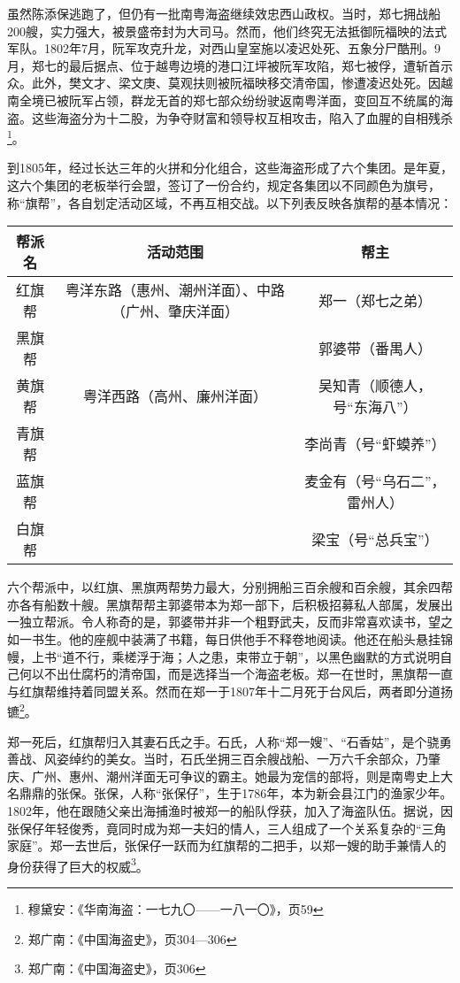 虽然陈添保逃跑了，但仍有一批南粤海盗继续效忠西山政权。当时，郑七拥战船200艘，实力强大，被景盛帝封为大司马。然而，他们终究无法抵御阮福映的法式军队。1802年7月，阮军攻克升龙，对西山皇室施以凌迟处死、五象分尸酷刑。9月，郑七的最后据点、位于越粤边境的港口江坪被阮军攻陷，郑七被俘，遭斩首示众。此外，樊文才、梁文庚、莫观扶则被阮福映移交清帝国，惨遭凌迟处死。因越南全境已被阮军占领，群龙无首的郑七部众纷纷驶返南粤洋面，变回互不统属的海盗。这些海盗分为十二股，为争夺财富和领导权互相攻击，陷入了血腥的自相残杀\footnote{穆黛安：《华南海盗：一七九〇——一八一〇》，页59}。

到1805年，经过长达三年的火拼和分化组合，这些海盗形成了六个集团。是年夏，这六个集团的老板举行会盟，签订了一份合约，规定各集团以不同颜色为旗号，称“旗帮”，各自划定活动区域，不再互相交战。以下列表反映各旗帮的基本情况：

\begin{center}
	\begin{tabular}{ c | c | c}
		\hline
		帮派名 & 活动范围 & 帮主 \\
		\hline
		
		红旗帮 & 粤洋东路（惠州、潮州洋面）、中路（广州、肇庆洋面） & 郑一（郑七之弟）\\
		
		黑旗帮 &  & 郭婆带（番禺人）\\
		
		黄旗帮 & 粤洋西路（高州、廉州洋面） & 吴知青（顺德人，号“东海八”）\\
		
		青旗帮 &  & 李尚青（号“虾蟆养”）\\
		
		蓝旗帮 &  & 麦金有（号“乌石二”，雷州人）\\
		
		白旗帮 &  & 梁宝（号“总兵宝”）
	\end{tabular}
\end{center}

六个帮派中，以红旗、黑旗两帮势力最大，分别拥船三百余艘和百余艘，其余四帮亦各有船数十艘。黑旗帮帮主郭婆带本为郑一部下，后积极招募私人部属，发展出一独立帮派。令人称奇的是，郭婆带并非一个粗野武夫，反而非常喜欢读书，望之如一书生。他的座舰中装满了书籍，每日供他手不释卷地阅读。他还在船头悬挂锦幔，上书“道不行，乘槎浮于海；人之患，束带立于朝”，以黑色幽默的方式说明自己何以不出仕腐朽的清帝国，而是选择当一个海盗老板。郑一在世时，黑旗帮一直与红旗帮维持着同盟关系。然而在郑一于1807年十二月死于台风后，两者即分道扬镳\footnote{郑广南：《中国海盗史》，页304—306}。

郑一死后，红旗帮归入其妻石氏之手。石氏，人称“郑一嫂”、“石香姑”，是个骁勇善战、风姿绰约的美女。当时，石氏坐拥三百余艘战船、一万六千余部众，乃肇庆、广州、惠州、潮州洋面无可争议的霸主。她最为宠信的部将，则是南粤史上大名鼎鼎的张保。张保，人称“张保仔”，生于1786年，本为新会县江门的渔家少年。1802年，他在跟随父亲出海捕渔时被郑一的船队俘获，加入了海盗队伍。据说，因张保仔年轻俊秀，竟同时成为郑一夫妇的情人，三人组成了一个关系复杂的“三角家庭”。郑一去世后，张保仔一跃而为红旗帮的二把手，以郑一嫂的助手兼情人的身份获得了巨大的权威\footnote{郑广南：《中国海盗史》，页306}。

